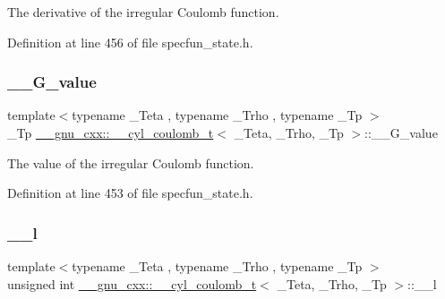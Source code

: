 The derivative of the irregular Coulomb function. 



Definition at line 456 of file specfun\+\_\+state.\+h.

\mbox{\label{struct____gnu__cxx_1_1____cyl__coulomb__t_a918861ff5873097675aa5fc9d5d3a5cd}} 
\subsubsection{\texorpdfstring{\+\_\+\+\_\+\+G\+\_\+value}{\_\_G\_value}}
{\footnotesize\ttfamily template$<$typename \+\_\+\+Teta , typename \+\_\+\+Trho , typename \+\_\+\+Tp $>$ \\
\+\_\+\+Tp \hyperlink{struct____gnu__cxx_1_1____cyl__coulomb__t}{\+\_\+\+\_\+gnu\+\_\+cxx\+::\+\_\+\+\_\+cyl\+\_\+coulomb\+\_\+t}$<$ \+\_\+\+Teta, \+\_\+\+Trho, \+\_\+\+Tp $>$\+::\+\_\+\+\_\+\+G\+\_\+value}



The value of the irregular Coulomb function. 



Definition at line 453 of file specfun\+\_\+state.\+h.

\mbox{\label{struct____gnu__cxx_1_1____cyl__coulomb__t_a402fdb5865c435194f923e50e551799e}} 
\subsubsection{\texorpdfstring{\+\_\+\+\_\+l}{\_\_l}}
{\footnotesize\ttfamily template$<$typename \+\_\+\+Teta , typename \+\_\+\+Trho , typename \+\_\+\+Tp $>$ \\
unsigned int \hyperlink{struct____gnu__cxx_1_1____cyl__coulomb__t}{\+\_\+\+\_\+gnu\+\_\+cxx\+::\+\_\+\+\_\+cyl\+\_\+coulomb\+\_\+t}$<$ \+\_\+\+Teta, \+\_\+\+Trho, \+\_\+\+Tp $>$\+::\+\_\+\+\_\+l}



